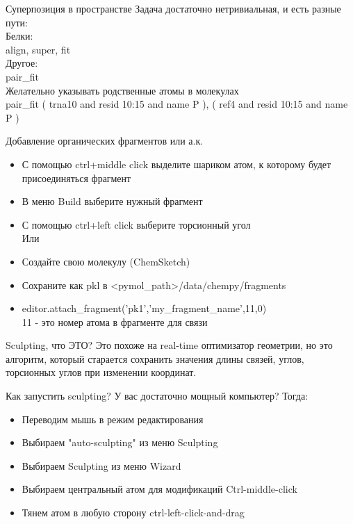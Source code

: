 	\begin{frame}{Суперпозиция в пространстве}
			Задача достаточно нетривиальная, и есть разные пути:\\

			Белки:\\
			 \textcolor{blue!40!white}{align, super, fit}\\
			Другое:\\
			 \textcolor{blue!40!white}{pair\_fit }\\
			Желательно указывать родственные атомы в молекулах\\
			 \textcolor{blue!40!white}{pair\_fit ( trna10 and resid 10:15 and name P ), ( ref4 and resid 10:15 and name P ) }
	 \end{frame}
		 
	\begin{frame}{Добавление органических фрагментов или а.к.}
			\begin{itemize}
				\item С помощью ctrl+middle click выделите шариком атом, к которому будет присоединяться фрагмент
				\item В меню Build выберите нужный фрагмент
				\item С помощью ctrl+left click выберите торсионный угол\\
					Или \\
				\item Создайте свою молекулу (ChemSketch)
				\item Сохраните как pkl в  <pymol\_path>/data/chempy/fragments
				\item \textcolor{blue!40!white}{editor.attach\_fragment('pk1','my\_fragment\_name',11,0)}\\
					  11 - это номер атома в фрагменте для связи
			\end{itemize}
	\end{frame}


	\begin{frame}{Sculpting, что ЭТО?}
			Это похоже на real-time оптимизатор геометрии, но это алгоритм, который старается сохранить значения длины связей, углов, торсионных углов при изменении координат. 
	\end{frame}

	\begin{frame}{Как запустить sculpting?}
			У вас достаточно мощный компьютер? Тогда:\\
			\begin{itemize}
				\item Переводим мышь в режим редактирования
				\item Выбираем "auto-sculpting" из меню Sculpting 
				\item Выбираем Sculpting из меню Wizard
				\item Выбираем центральный атом для модификаций Ctrl-middle-click 
				\item Тянем атом в любую сторону ctrl-left-click-and-drag 
			\end{itemize}
	\end{frame}

